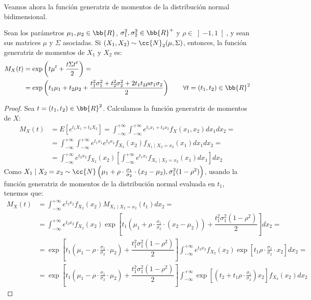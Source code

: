 Veamos ahora la función generatriz de momentos de la distribución normal bidimensional.
\begin{prop}
    Sean los parámetros $\mu_1, \mu_2\in \bb{R}$, $\sigma_1^2, \sigma_2^2\in \bb{R}^+$ y $\rho\in \left]-1,1\right[$, y sean sus matrices $\mu$ y $\Sigma$ asociadas.
    Si $(X_1, X_2)\sim \cc{N}_2(\mu, \Sigma)$, entonces, la función generatriz de momentos de $X_1$ y $X_2$ es:    
    \begin{align*}
        M_X(t) &= \exp\left(t\mu^t +\dfrac{t\Sigma t^t}{2}\right)
        =\\&= \exp\left(t_1\mu_1+t_2\mu_2+\dfrac{t_1^2\sigma_1^2+t_2^2\sigma_2^2+2t_1t_2\rho\sigma_1\sigma_2}{2}\right)\qquad \forall t=(t_1, t_2)\in \bb{R}^2
    \end{align*}
\end{prop}
\begin{proof}
    Sea $t=(t_1, t_2)\in \bb{R}^2$. Calculamos la función generatriz de momentos de $X$:
    \begin{align*}
        M_X(t)&=E\left[e^{t_1X_1+t_2X_2}\right]
        = \int_{-\infty}^{+\infty}\int_{-\infty}^{+\infty} e^{t_1x_1+t_2x_2}f_X(x_1,x_2)dx_1dx_2
        =\\&= \int_{-\infty}^{+\infty}\int_{-\infty}^{+\infty} e^{t_1x_1}e^{t_2x_2}f_{X_2}(x_2)f_{X_1\mid X_2=x_2}(x_1)dx_1dx_2
        =\\&= \int_{-\infty}^{+\infty} e^{t_2x_2}f_{X_2}(x_2)\left[\int_{-\infty}^{+\infty} e^{t_1x_1}f_{X_1\mid X_2=x_2}(x_1)dx_1\right]dx_2
    \end{align*}
    Como $X_1\mid X_2=x_2\sim \cc{N}\left(\mu_1+\rho\cdot \frac{\sigma_1}{\sigma_2}\cdot (x_2-\mu_2), \sigma_1^2(1-\rho^2)\right)$, usando la función generatriz de momentos de la distribución normal evaluada en $t_1$, tenemos que:
    \begin{align*}
        M_X(t)&= \int_{-\infty}^{+\infty} e^{t_2x_2}f_{X_2}(x_2)M_{X_1\mid X_2=x_2}(t_1)dx_2
        =\\&= \int_{-\infty}^{+\infty} e^{t_2x_2}f_{X_2}(x_2)\exp\left[t_1\left(\mu_1+\rho\cdot \frac{\sigma_1}{\sigma_2}\cdot (x_2-\mu_2)\right)+\dfrac{t_1^2\sigma_1^2(1-\rho^2)}{2}\right]dx_2
        =\\&= \exp\left[t_1\left(\mu_1-\rho\cdot \frac{\sigma_1}{\sigma_2}\cdot \mu_2\right)+\dfrac{t_1^2\sigma_1^2(1-\rho^2)}{2}\right]\int_{-\infty}^{+\infty} e^{t_2x_2}f_{X_2}(x_2)\exp\left[t_1\rho\cdot \frac{\sigma_1}{\sigma_2}\cdot x_2\right]dx_2
        =\\&= \exp\left[t_1\left(\mu_1-\rho\cdot \frac{\sigma_1}{\sigma_2}\cdot \mu_2\right)+\dfrac{t_1^2\sigma_1^2(1-\rho^2)}{2}\right]\int_{-\infty}^{+\infty} \exp\left[\left(t_2+t_1\rho\cdot \frac{\sigma_1}{\sigma_2}\right)x_2\right]f_{X_2}(x_2)dx_2
    \end{align*}


\end{proof}
